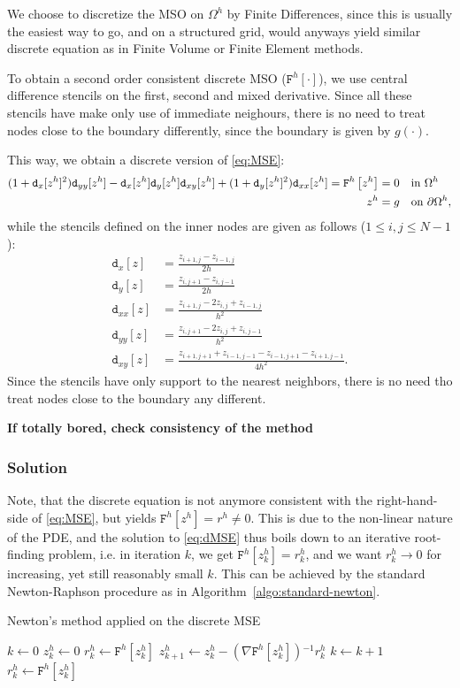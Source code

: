 \documentclass[11pt]{scrartcl}
\newcommand{\mSurfDisc}[1]{\ensuremath{\mathtt{F}^h\left[#1\right]}}
\newcommand{\Dx}[1]{\ensuremath{\mathtt{d}_x[#1]}}
\newcommand{\Dy}[1]{\ensuremath{\mathtt{d}_y[#1]}}
\newcommand{\Dxx}[1]{\ensuremath{\mathtt{d}_{xx}[#1]}}
\newcommand{\Dyy}[1]{\ensuremath{\mathtt{d}_{yy}[#1]}}
\newcommand{\Dxy}[1]{\ensuremath{\mathtt{d}_{xy}[#1]}}
\newcommand{\inv}{\ensuremath{^{-1}}}
\begin{document}
We choose to discretize the MSO on $\Omega^h$ by Finite Differences, since this is usually the easiest way to go, and on a structured grid, would anyways yield similar discrete equation as in Finite Volume or Finite Element methods.

To obtain a second order consistent discrete MSO (\mSurfDisc{\cdot}), we use central difference stencils on the first, second and mixed derivative. Since all these stencils have make only use of immediate neighours, there is no need to treat nodes close to the boundary differently, since the boundary is given by $g(\cdot)$.

This way, we obtain a discrete version of \eqref{eq:MSE}:
\begin{align}
	(1+\Dx{z^h}^2)\Dyy{z^h}-\Dx{z^h} \Dy{z^h}\Dxy{z^h} + (1+\Dy{z^h}^2)\Dxx{z^h} = \mSurfDisc{z^h} &= 0  \quad \text{in } \Omega^h \notag \\
	z^h &= g \quad \text{on } \partial\Omega^h \label{eq:dMSE},
\end{align}
while the stencils defined on the inner nodes are given as follows ($1 \le i,j \le N-1$):
\begin{align}
	\Dx{z} &= \frac{z_{i+1,j}-z_{i-1,j}}{2h} \\
	\Dy{z} &= \frac{z_{i,j+1}-z_{i,j-1}}{2h} \\
	\Dxx{z} &= \frac{z_{i+1,j} - 2z_{i,j} + z_{i-1,j}}{h^2}\\
	\Dyy{z} &= \frac{z_{i,j+1} - 2z_{i,j} + z_{i,j-1}}{h^2}\\
	\Dxy{z} &= \frac{z_{i+1,j+1} + z_{i-1,j-1} - z_{i-1,j+1}-z_{i+1,j-1}}{4h^2}. 
\end{align}
Since the stencils have only support to the nearest neighbors, there is no need tho treat nodes close to the boundary any different. 

\textbf{If totally bored, check consistency of the method}

\subsubsection{Solution}
Note, that the discrete equation is not anymore consistent with the right-hand-side of \eqref{eq:MSE}, but yields $\mSurfDisc{z^h} = r^h \neq 0$. This is due to the non-linear nature of the PDE, and the solution to \eqref{eq:dMSE} thus boils down to an iterative root-finding problem, i.e. in iteration $k$, we get $\mSurfDisc{z^h_k}=r^h_k$, and we want $r^h_k \to 0$ for increasing, yet still reasonably small $k$. This can be achieved by the standard Newton-Raphson procedure as in Algorithm~\ref{algo:standard-newton}.
\begin{algorithm}
	\caption{Newton's method applied on the discrete MSE}\label{algo:standard-newton}
	\begin{algorithmic}
		\State $k \gets 0$ 
		\State $z^h_k \gets 0 $ 
		\State $r^h_k \gets \mSurfDisc{z^h_k}$
		 
			\State $z^h_{k+1} \gets z^h_{k} - \left(\nabla\mSurfDisc{z^h_k}\right)\inv r^h_k $
			\State $k \gets k+1$ 
			\State $r^h_k \gets \mSurfDisc{z^h_k}$
		\EndWhile
	\end{algorithmic}
\end{algorithm}
\end{document}
